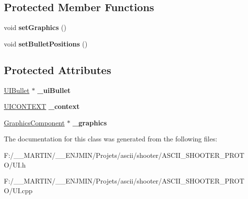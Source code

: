 \subsection*{Protected Member Functions}
\begin{DoxyCompactItemize}
\item 
\hypertarget{class_u_i_a2f93274796ee43d83145b042b1844b93}{}\label{class_u_i_a2f93274796ee43d83145b042b1844b93} 
void {\bfseries set\+Graphics} ()
\item 
\hypertarget{class_u_i_a626a653f29b66e351efe58085001ad87}{}\label{class_u_i_a626a653f29b66e351efe58085001ad87} 
void {\bfseries set\+Bullet\+Positions} ()
\end{DoxyCompactItemize}
\subsection*{Protected Attributes}
\begin{DoxyCompactItemize}
\item 
\hypertarget{class_u_i_aac95c488322f728b500db6d6b2c57ec4}{}\label{class_u_i_aac95c488322f728b500db6d6b2c57ec4} 
\hyperlink{class_u_i_bullet}{U\+I\+Bullet} $\ast$ {\bfseries \+\_\+ui\+Bullet}
\item 
\hypertarget{class_u_i_a6c660cea67e5c6f8c2e94a6f218e5589}{}\label{class_u_i_a6c660cea67e5c6f8c2e94a6f218e5589} 
\hyperlink{struct_u_i_c_o_n_t_e_x_t}{U\+I\+C\+O\+N\+T\+E\+XT} {\bfseries \+\_\+context}
\item 
\hypertarget{class_u_i_ad27cd3cd68f3ab9f8626dc855891ec39}{}\label{class_u_i_ad27cd3cd68f3ab9f8626dc855891ec39} 
\hyperlink{class_graphics_component}{Graphics\+Component} $\ast$ {\bfseries \+\_\+graphics}
\end{DoxyCompactItemize}


The documentation for this class was generated from the following files\+:\begin{DoxyCompactItemize}
\item 
F\+:/\+\_\+\+\_\+\+M\+A\+R\+T\+I\+N/\+\_\+\+\_\+\+E\+N\+J\+M\+I\+N/\+Projets/ascii/shooter/\+A\+S\+C\+I\+I\+\_\+\+S\+H\+O\+O\+T\+E\+R\+\_\+\+P\+R\+O\+T\+O/U\+I.\+h\item 
F\+:/\+\_\+\+\_\+\+M\+A\+R\+T\+I\+N/\+\_\+\+\_\+\+E\+N\+J\+M\+I\+N/\+Projets/ascii/shooter/\+A\+S\+C\+I\+I\+\_\+\+S\+H\+O\+O\+T\+E\+R\+\_\+\+P\+R\+O\+T\+O/U\+I.\+cpp\end{DoxyCompactItemize}
